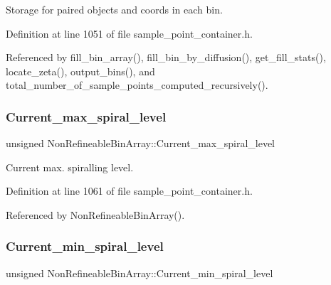 Storage for paired objects and coords in each bin. 



Definition at line 1051 of file sample\+\_\+point\+\_\+container.\+h.



Referenced by fill\+\_\+bin\+\_\+array(), fill\+\_\+bin\+\_\+by\+\_\+diffusion(), get\+\_\+fill\+\_\+stats(), locate\+\_\+zeta(), output\+\_\+bins(), and total\+\_\+number\+\_\+of\+\_\+sample\+\_\+points\+\_\+computed\+\_\+recursively().

\mbox{\label{classNonRefineableBinArray_a4cc397e661be3130014df3f634a0e92a}} 
\subsubsection{\texorpdfstring{Current\+\_\+max\+\_\+spiral\+\_\+level}{Current\_max\_spiral\_level}}
{\footnotesize\ttfamily unsigned Non\+Refineable\+Bin\+Array\+::\+Current\+\_\+max\+\_\+spiral\+\_\+level\hspace{0.3cm}{\ttfamily [private]}}



Current max. spiralling level. 



Definition at line 1061 of file sample\+\_\+point\+\_\+container.\+h.



Referenced by Non\+Refineable\+Bin\+Array().

\mbox{\label{classNonRefineableBinArray_a2bcdae813c2cf3bd8d319149755e1d7a}} 
\subsubsection{\texorpdfstring{Current\+\_\+min\+\_\+spiral\+\_\+level}{Current\_min\_spiral\_level}}
{\footnotesize\ttfamily unsigned Non\+Refineable\+Bin\+Array\+::\+Current\+\_\+min\+\_\+spiral\+\_\+level\hspace{0.3cm}{\ttfamily [private]}}



